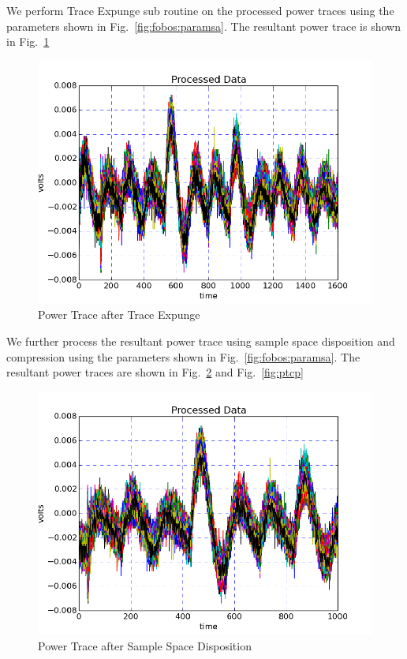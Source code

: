 \documentclass{llncs}
\numberwithin{algorithm}{chapter}
\begin{document}
We perform Trace Expunge sub routine on the processed power traces
using the parameters shown in Fig.~\ref{fig:fobos:paramsa}. The resultant power trace is
shown in Fig.~\ref{fig:pttx}

\begin{figure}[H]
\begin{center}
\includegraphics[scale=0.8]{figures/scaTrace2}
\caption{\label{fig:pttx}Power Trace after Trace Expunge}
\end{center} 
\vspace{-3ex}
\end{figure}

We further process the resultant power trace using sample space disposition and compression
using the parameters shown in Fig.~\ref{fig:fobos:paramsa}.
 The resultant
power traces are shown in Fig.~\ref{fig:ptsp} and Fig.~\ref{fig:ptcp}

\begin{figure}[H]
\begin{center}
\includegraphics[scale=0.8]{figures/scaTrace3}
\caption{\label{fig:ptsp}Power Trace after Sample Space Disposition}
\end{center} 
\vspace{-3ex}
\end{figure}
\end{document}
